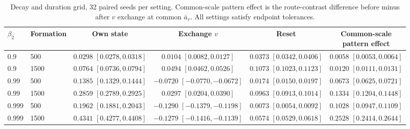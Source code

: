 \begin{table}[ht]
\centering\small
\caption{Decay and duration grid, 32 paired seeds per setting. Common-scale pattern effect is the route-contrast difference before minus after $v$ exchange at common $\bar a_v$. All settings satisfy endpoint tolerances.}
\label{tab:ivfbeta}
\begin{tabular}{llcccc}
\toprule
$\beta_2$ & Formation & Own state & Exchange $v$ & Reset & \shortstack{Common-scale\\pattern effect}\\
\midrule
$0.9$ & 500 & \shortstack{$0.0298$\\$[0.0278,0.0318]$} & \shortstack{$0.0104$\\$[0.0082,0.0127]$} & \shortstack{$0.0373$\\$[0.0342,0.0406]$} & \shortstack{$0.0058$\\$[0.0053,0.0064]$} \\
$0.9$ & 1500 & \shortstack{$0.0764$\\$[0.0736,0.0794]$} & \shortstack{$0.0494$\\$[0.0462,0.0526]$} & \shortstack{$0.1073$\\$[0.1023,0.1123]$} & \shortstack{$0.0120$\\$[0.0111,0.0131]$} \\
$0.99$ & 500 & \shortstack{$0.1385$\\$[0.1329,0.1444]$} & \shortstack{$-0.0720$\\$[-0.0770,-0.0672]$} & \shortstack{$0.0174$\\$[0.0150,0.0197]$} & \shortstack{$0.0673$\\$[0.0625,0.0721]$} \\
$0.99$ & 1500 & \shortstack{$0.2859$\\$[0.2789,0.2925]$} & \shortstack{$0.0297$\\$[0.0204,0.0390]$} & \shortstack{$0.0963$\\$[0.0913,0.1014]$} & \shortstack{$0.1334$\\$[0.1204,0.1448]$} \\
$0.999$ & 500 & \shortstack{$0.1962$\\$[0.1881,0.2043]$} & \shortstack{$-0.1290$\\$[-0.1379,-0.1198]$} & \shortstack{$0.0073$\\$[0.0054,0.0092]$} & \shortstack{$0.1028$\\$[0.0947,0.1109]$} \\
$0.999$ & 1500 & \shortstack{$0.4341$\\$[0.4277,0.4408]$} & \shortstack{$-0.1279$\\$[-0.1416,-0.1139]$} & \shortstack{$0.0574$\\$[0.0529,0.0618]$} & \shortstack{$0.2528$\\$[0.2414,0.2644]$} \\
\bottomrule
\end{tabular}

\end{table}

